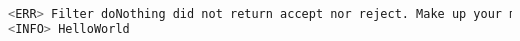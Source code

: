 \begin{lstlisting}[language=bash, caption={Filter printing message.}]
<ERR> Filter doNothing did not return accept nor reject. Make up your mind
<INFO> HelloWorld
\end{lstlisting}